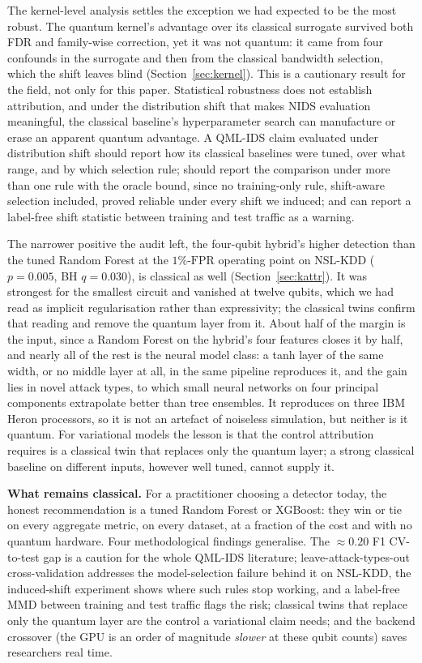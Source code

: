 \documentclass[preprint,11pt]{elsarticle}
\newcommand{\fpr}{\mathrm{FPR}}
\begin{document}
The kernel-level analysis settles the exception we had expected to be the most robust. The quantum
kernel's advantage over its classical surrogate survived both FDR and family-wise correction, yet it was
not quantum: it came from four confounds in the surrogate and then from the classical bandwidth selection, which the
shift leaves blind (Section~\ref{sec:kernel}). This is a cautionary result for the field, not only for this
paper. Statistical robustness does not establish attribution, and under the distribution shift that makes
NIDS evaluation meaningful, the classical baseline's hyperparameter search can manufacture or erase an
apparent quantum advantage. A QML-IDS claim evaluated under distribution shift should report how its classical baselines were tuned,
over what range, and by which selection rule; should report the comparison under more than one rule with
the oracle bound, since no training-only rule, shift-aware selection included, proved reliable under
every shift we induced; and can report a label-free shift statistic between training and test traffic
as a warning.

The narrower positive the audit left, the four-qubit hybrid's higher detection than the tuned Random
Forest at the $1\%$-$\fpr$ operating point on NSL-KDD ($p=0.005$, BH $q=0.030$), is classical as well
(Section~\ref{sec:kattr}). It was strongest for the smallest circuit and vanished at twelve qubits, which
we had read as implicit regularisation rather than expressivity; the classical twins confirm that reading
and remove the quantum layer from it. About half of the margin is the input, since a Random Forest on the
hybrid's four features closes it by half, and nearly all of the rest is the neural model class: a tanh
layer of the same width, or no middle layer at all, in the same pipeline reproduces it, and the gain lies
in novel attack types, to which small neural networks on four principal components extrapolate better
than tree ensembles. It reproduces on three IBM Heron processors, so it is not an artefact of noiseless
simulation, but neither is it quantum. For variational models the lesson is that the control attribution
requires is a classical twin that replaces only the quantum layer; a strong classical baseline on
different inputs, however well tuned, cannot supply it.

\textbf{What remains classical.} For a practitioner choosing a detector today, the honest recommendation
is a tuned Random Forest or XGBoost: they win or tie on every aggregate metric, on every dataset, at a
fraction of the cost and with no quantum hardware. Four methodological findings generalise. The $\approx 0.20$ F1 CV-to-test gap is a caution for the
whole QML-IDS literature; leave-attack-types-out cross-validation addresses the model-selection failure
behind it on NSL-KDD, the induced-shift experiment shows where such rules stop working, and a label-free
MMD between training and test traffic flags the risk; classical twins that replace only the quantum
layer are the control a variational claim needs; and the backend crossover (the GPU is an
order of magnitude \emph{slower} at these qubit counts) saves researchers real time.
\end{document}
